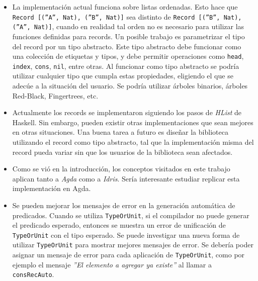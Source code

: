 \begin{itemize}
\item La implementación actual funciona sobre listas ordenadas. Esto hace que \texttt{Record [(''A'', Nat), (''B'', Nat)]} sea distinto de \texttt{Record [(''B'', Nat), (''A'', Nat)]}, cuando en realidad tal orden no es necesario para utilizar las funciones definidas para records. Un posible trabajo es parametrizar el tipo del record por un tipo abstracto. Este tipo abstracto debe funcionar como una colección de etiquetas y tipos, y debe permitir operaciones como \texttt{head}, \texttt{index}, \texttt{cons}, \texttt{nil}, entre otras. Al funcionar como tipo abstracto se podría utilizar cualquier tipo que cumpla estas propiedades, eligiendo el que se adecúe a la situación del usuario. Se podría utilizar árboles binarios, árboles Red-Black, Fingertrees, etc.

\item Actualmente los records se implementaron siguiendo los pasos de \textit{HList} de Haskell. Sin embargo, pueden existir otras implementaciones que sean mejores en otras situaciones. Una buena tarea a futuro es diseñar la biblioteca utilizando el record como tipo abstracto, tal que la implementación misma del record pueda variar sin que los usuarios de la biblioteca sean afectados.

\item Como se vió en la introducción, los conceptos visitados en este trabajo aplican tanto a \textit{Agda} como a \textit{Idris}. Sería interesante estudiar replicar esta implementación en Agda.

\item Se pueden mejorar los mensajes de error en la generación automática de predicados. Cuando se utiliza \texttt{TypeOrUnit}, si el compilador no puede generar el predicado esperado, entonces se muestra un error de unificación de \texttt{TypeOrUnit} con el tipo esperado. Se puede investigar una nueva forma de utilizar \texttt{TypeOrUnit} para mostrar mejores mensajes de error. Se debería poder asignar un mensaje de error para cada aplicación de \texttt{TypeOrUnit}, como por ejemplo el mensaje \textit{''El elemento a agregar ya existe''} al llamar a \texttt{consRecAuto}.
\end{itemize}
